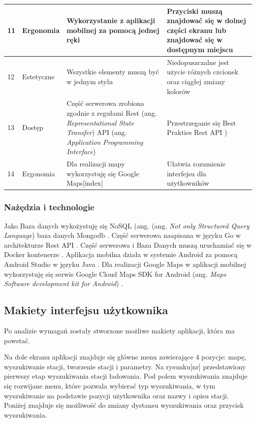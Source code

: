 \begin{table}[htb]
\begin{tabular}{| m{0.5cm} | m{3cm} | m{5.75cm} | m{5.75cm} |}
    \hline
    11 & Ergonomia & Wykorzystanie z aplikacji mobilnej za pomocą jednej ręki & Przyciski muszą znajdować się w dolnej części ekranu lub znajdować się w dostępnym miejscu \\
    \hline
    12 & Estetyczne & Wszystkie elementy muszą być w jednym stylu & Niedopuszczalne jest użycie różnych czcionek oraz ciągłej zmiany kolorów \\
    \hline
    13 & Dostęp & Część serwerowa zrobiona zgodnie z regułami Rest (ang. \textit{Representational State Transfer}) API (ang. \textit{Application Programming Interface}) & Przestrzeganie się Best Prakties Rest API \cite{rest_api_best}) \\
    \hline
    14 & Ergonomia & Dla realizacji mapy wykorzystuję się Google Maps[index] & Ułatwia rozumienie interfejsu dla użytkowników \\
    \hline
\end{tabular}
\end{table}
\newpage
\subsubsection{Nażędzia i technologie}
Jako Baza danych wykożystuję się NoSQL (ang. (ang. \textit{Not only Structured Query Language}) baza danych Mongodb \cite{mongodb,mongodb_doc}.
Część serwerowa naapisana w języku Go \cite{golang1,golang2,golang3,godoc} w architekturze Rest API \cite{rest_api_best}.
Część serwerowa i Baza Danych muszą uruchamiać się w Docker kontenerze \cite{docker,docker_doc}.
Aplikacja mobilna działa w systemie Android za pomocą Android Studio \cite{android_doc,android_studio,gradle,gradle_android_doc} w języku Java \cite{java_doc}.
Dla realizacji Google Maps w aplikacji mobilnej wykorzystuję się serwis Google Cloud \cite{google_cloud} Maps SDK for Android (ang. \textit{Maps Software development kit for Android}) \cite{maps_sdk}.

\subsection{Makiety interfejsu użytkownika}
Po analizie wymagań zostały stworzone możliwe makiety aplikacji, która ma powstać.

Na dole ekranu aplikacji znajduje się główne menu zawierające 4 pozycje: mapę, wyszukiwanie stacji, tworzenie stacji i parametry.
Na rysunku[nr] przedstawiony pierwszy etap wyszukiwania stacji ładowania.
Pod polem wyszukiwania znajduje się rozwijane menu, które pozwala wybierać typ wyszukiwania, w tym wyszukiwanie na podstawie pozycji użytkownika oraz nazwy i opisu stacji.
Poniżej znajduje się możliwość do zmiany dystansu wyszukiwania oraz przycisk wyszukiwania.

